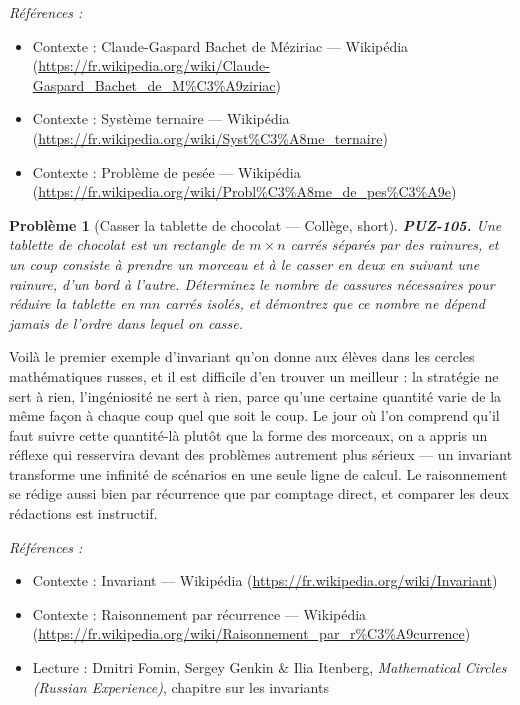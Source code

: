 \documentclass[11pt]{article}
\newtheorem{problem}{Problème}
\newenvironment{refs}{\par\small\noindent\emph{Références :}\begin{itemize}\setlength\itemsep{0pt}}{\end{itemize}\normalsize}
\begin{document}
\begin{refs}
\item Contexte : Claude-Gaspard Bachet de Méziriac --- Wikipédia (\url{https://fr.wikipedia.org/wiki/Claude-Gaspard_Bachet_de_M%C3%A9ziriac})
\item Contexte : Système ternaire --- Wikipédia (\url{https://fr.wikipedia.org/wiki/Syst%C3%A8me_ternaire})
\item Contexte : Problème de pesée --- Wikipédia (\url{https://fr.wikipedia.org/wiki/Probl%C3%A8me_de_pes%C3%A9e})
\end{refs}

\bigskip

\begin{problem}[{Casser la tablette de chocolat --- Collège, short}]
\textbf{PUZ-105.} Une tablette de chocolat est un rectangle de
$ m \times n $ carrés séparés par des rainures, et un coup consiste à prendre un morceau et
à le casser en deux en suivant une rainure, d'un bord à l'autre. Déterminez le nombre de
cassures nécessaires pour réduire la tablette en $ mn $ carrés isolés, et démontrez que ce
nombre ne dépend jamais de l'ordre dans lequel on casse.
\end{problem}

\noindent Voilà le premier exemple d'invariant qu'on donne aux élèves dans les cercles
mathématiques russes, et il est difficile d'en trouver un meilleur : la stratégie ne sert à
rien, l'ingéniosité ne sert à rien, parce qu'une certaine quantité varie de la même façon à
chaque coup quel que soit le coup. Le jour où l'on comprend qu'il faut suivre cette
quantité-là plutôt que la forme des morceaux, on a appris un réflexe qui resservira devant
des problèmes autrement plus sérieux --- un invariant transforme une infinité de scénarios en
une seule ligne de calcul. Le raisonnement se rédige aussi bien par récurrence que par
comptage direct, et comparer les deux rédactions est instructif.

\begin{refs}
\item Contexte : Invariant --- Wikipédia (\url{https://fr.wikipedia.org/wiki/Invariant})
\item Contexte : Raisonnement par récurrence --- Wikipédia (\url{https://fr.wikipedia.org/wiki/Raisonnement_par_r%C3%A9currence})
\item Lecture : Dmitri Fomin, Sergey Genkin \& Ilia Itenberg, \textit{Mathematical Circles (Russian Experience)}, chapitre sur les invariants
\end{refs}
\end{document}
